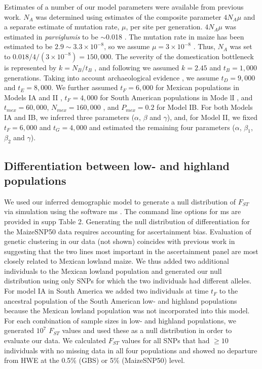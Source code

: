 Estimates of a number of our model parameters were available from previous work.    
$N_A$ was determined using estimates of the composite parameter $4N_A\mu$ and a separate estimate of mutation rate, $\mu$, per site per generation.  $4N_A\mu$ was estimated in \emph{parviglumis} to be $\sim$0.018  \cite[]{Eyre-Walker_1998_9539756,Tenaillon_2001_11470895,Tenaillon_2004_15014173,Wright_2005_15919994,Ross-Ibarra_2009_19153259}.  
The mutation rate in maize has been estimated to be $2.9\sim 3.3\times 10^{-8}$, so we assume $\mu=3\times 10^{-8}$ \cite[]{Clark_2005_16079248}.  
Thus, $N_A$ was set to $0.018/4/(3\times 10^{-8}) = 150,000$.
The severity of the domestication bottleneck is represented by $k=N_B/t_B$ \cite[]{Eyre-Walker_1998_9539756,Wright_2005_15919994}, and following \cite{Wright_2005_15919994} we assumed $k=2.45$ and $t_B=1,000$ generations.  
Taking into account archaeological evidence \cite[]{Piperno_2009_19307570}, we assume $t_D=9,000$ and $t_E=8,000$.  
We further assumed $t_F=6,000$ for Mexican populations in Models IA and II \cite[]{Piperno_2006_69}, $t_F=4,000$ for South American populations in Mode lI \cite[]{Perry_2006_16511492}, and $t_{mex}=60,000$, $N_{mex}=160,000$ \cite[]{Ross-Ibarra_2009_19153259}, and $P_{mex}=0.2$ \cite[]{vanHeerwaarden_2011_21189301} for Model IB. 
For both Models IA and IB, we inferred three parameters ($\alpha$, $\beta$ and $\gamma$), and, for Model II, we fixed $t_F=6,000$ and $t_G=4,000$ \cite[]{Piperno_2006_69,Perry_2006_16511492} and estimated the remaining four parameters ($\alpha$, $\beta_1$, $\beta_2$ and $\gamma$).

\subsection*{Differentiation between low- and highland populations}
We used our inferred demographic model to generate a null distribution of $F_{ST}$ via simulation using the software {\sf ms} \cite[]{Hudson_2002_11847089}.   
The command line options for {\sf ms} are provided in supp Table 2.  Generating the null distribution of differentiation for the MaizeSNP50 data requires accounting for ascertainment bias. Evaluation of genetic clustering in our data (not shown) coincides with previous work \cite[]{Hufford_2012_22660546} in suggesting that the two lines most important in the ascertainment panel are most closely related to Mexican lowland maize.  
We thus added two additional individuals to the Mexican lowland population and generated our null distribution using only SNPs for which the two individuals had different alleles. For model IA in South America we added two individuals at time $t_F$ to the ancestral population of the South American low- and highland populations because the Mexican lowland population was not incorporated into this model. For each combination of sample sizes in low- and highland populations, we generated $10^7$ $F_{ST}$ values and used these as a null distribution in order to evaluate our data.   We calculated $F_{ST}$ values for all SNPs that had $\geq10$ individuals with no missing data in all four populations and showed no departure from HWE at the 0.5\% (GBS) or 5\% (MaizeSNP50) level. 

